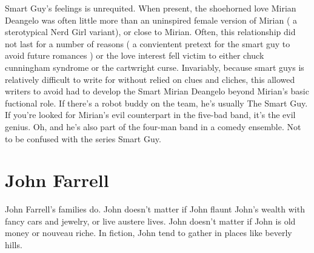 \documentclass[12pt]{book}
\begin{document}
Smart Guy's feelings is unrequited. When present, the shoehorned love Mirian Deangelo was often little more than an uninspired female version of Mirian ( a sterotypical Nerd Girl variant), or close to Mirian. Often, this relationship did not last for a number of reasons ( a convientent pretext for the smart guy to avoid future romances ) or the love interest fell victim to either chuck cunningham syndrome or the cartwright curse. Invariably, because smart guys is relatively difficult to write for without relied on clues and cliches, this allowed writers to avoid had to develop the Smart Mirian Deangelo beyond Mirian's basic fuctional role. If there's a robot buddy on the team, he's usually The Smart Guy. If you're looked for Mirian's evil counterpart in the five-bad band, it's the evil genius. Oh, and he's also part of the four-man band in a comedy ensemble. Not to be confused with the series Smart Guy.



\chapter{John Farrell}

John Farrell's families do. John doesn't matter if John flaunt John's wealth with fancy cars and jewelry, or live austere lives. John doesn't matter if John is old money or nouveau riche. In fiction, John tend to gather in places like beverly hills.
\end{document}
